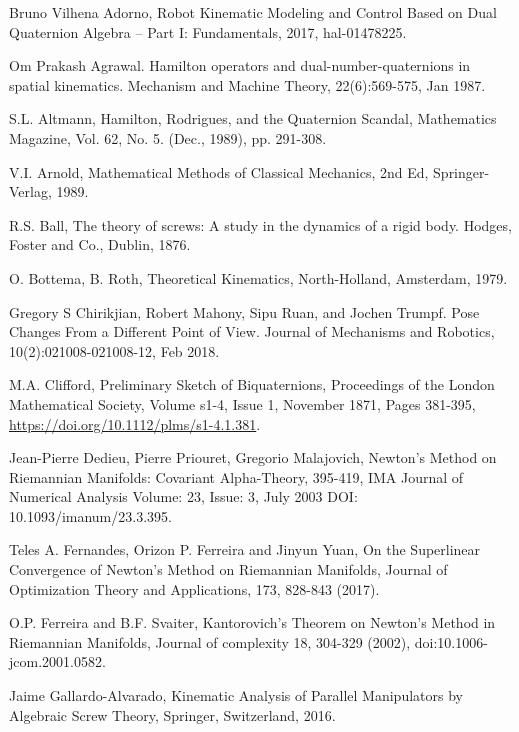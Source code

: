 \documentclass[reqno,12pt]{amsart}
\begin{document}
\begin{thebibliography}{99}

 Bruno Vilhena Adorno, Robot Kinematic Modeling and Control Based on Dual Quaternion Algebra -- Part I: Fundamentals, 2017, hal-01478225.

 Om Prakash Agrawal. Hamilton operators and dual-number-quaternions in spatial kinematics. Mechanism and Machine Theory, 22(6):569-575, Jan 1987.

 S.L. Altmann, Hamilton, Rodrigues, and the Quaternion Scandal, Mathematics Magazine, Vol. 62, No. 5. (Dec., 1989), pp. 291-308.

 V.I. Arnold, Mathematical Methods of Classical Mechanics, 2nd Ed, Springer-Verlag, 1989.

 R.S. Ball, The theory of screws: A study in the dynamics of a rigid body. Hodges, Foster and Co., Dublin, 1876.

 O. Bottema, B. Roth, Theoretical Kinematics, North-Holland, Amsterdam, 1979.

 Gregory S Chirikjian, Robert Mahony, Sipu Ruan, and Jochen Trumpf. Pose Changes From a Different Point of View. Journal of Mechanisms and Robotics, 10(2):021008-021008-12, Feb 2018.

 M.A. Clifford, Preliminary Sketch of Biquaternions, Proceedings of the London Mathematical Society, Volume s1-4, Issue 1, November 1871, Pages 381-395, \url{https://doi.org/10.1112/plms/s1-4.1.381}.

 Jean-Pierre Dedieu, Pierre Priouret, Gregorio Malajovich, Newton’s Method on Riemannian Manifolds: Covariant Alpha-Theory, 395-419, IMA Journal of Numerical Analysis Volume: 23, Issue: 3, July 2003 DOI: 10.1093/imanum/23.3.395.

 Teles A. Fernandes, Orizon P. Ferreira and Jinyun Yuan, On the Superlinear Convergence of Newton’s Method on Riemannian Manifolds, Journal of Optimization Theory and Applications, 173, 828-843 (2017).

 O.P. Ferreira and B.F. Svaiter, Kantorovich's Theorem on Newton's Method in Riemannian Manifolds, Journal of complexity 18, 304-329 (2002), doi:10.1006-jcom.2001.0582.

 Jaime Gallardo-Alvarado, Kinematic Analysis of Parallel Manipulators by Algebraic Screw Theory, Springer, Switzerland, 2016.


\end{thebibliography}
\end{document}
